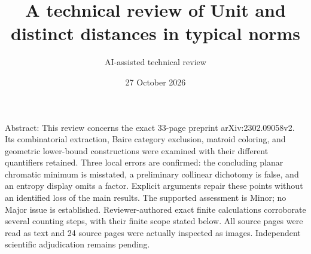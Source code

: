 \documentclass[10pt]{article}
\title{A technical review of
Unit and distinct distances in typical norms}
\author{AI-assisted technical review}
\date{27 October 2026}
\begin{document}
\maketitle
Abstract: This review concerns the exact 33-page preprint arXiv:2302.09058v2. Its combinatorial extraction, Baire category exclusion, matroid coloring, and geometric lower-bound constructions were examined with their different quantifiers retained. Three local errors are confirmed: the concluding planar chromatic minimum is misstated, a preliminary collinear dichotomy is false, and an entropy display omits a factor. Explicit arguments repair these points without an identified loss of the main results. The supported assessment is Minor; no Major issue is established. Reviewer-authored exact finite calculations corroborate several counting steps, with their finite scope stated below. All source pages were read as text and 24 source pages were actually inspected as images. Independent scientific adjudication remains pending.\par
\end{document}

